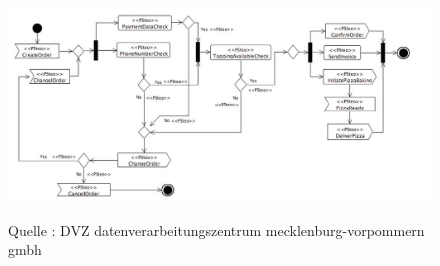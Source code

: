 \begin{center}
\begin{figure}[h]
   

\includegraphics[scale= 0.65]{Graphics/activitydiagram.jpg} 



Quelle : DVZ datenverarbeitungszentrum mecklenburg-vorpommern gmbh

\label{fig4}


\end{figure}
\end{center}

\newpage
